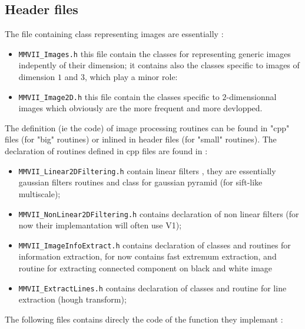 
\subsection{Header files}


The file containing class representing images are essentially :

\begin{itemize}
	\item {\tt MMVII\_Images.h} this file contain the classes for representing 
		generic images indepently of their dimension;
		it contains also the classes specific to images of dimension $1$ and $3$,
		which play a minor role:

	\item {\tt MMVII\_Image2D.h} this file contain the classes specific to $2$-dimensionnal
              images which obviously are the more frequent and more devlopped.
\end{itemize}


The definition (ie the code) of image processing routines can be found in "cpp" files
(for "big" routines) or inlined in header files (for "small" routines).
The declaration of routines defined in cpp files are found in :

\begin{itemize}
	\item {\tt MMVII\_Linear2DFiltering.h} contain linear filters , they are essentially
		gaussian filters routines and class for gaussian pyramid (for sift-like multiscale);

	\item {\tt MMVII\_NonLinear2DFiltering.h} contains declaration of non linear filters (for
		now their implemantation will often use  V1);

	\item {\tt MMVII\_ImageInfoExtract.h} contains declaration of classes and routines
		for information extraction, for now contains fast extremum extraction,
		and routine for extracting connected component on black and white image

	\item {\tt MMVII\_ExtractLines.h} contains declaration of classes and routine for 
		line extraction (hough transform);
\end{itemize}


The following files contains direcly the code of the function they implemant :

